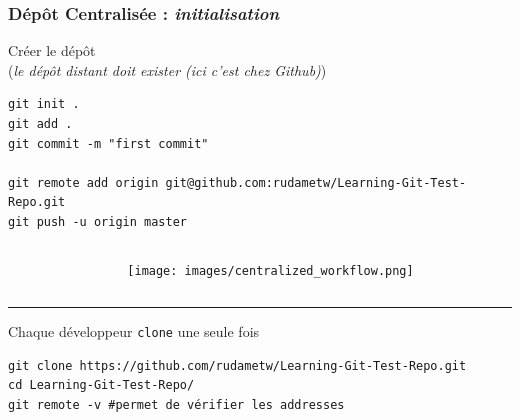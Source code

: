 \documentclass[table,tikz,12pt,svgnames]{beamer}
\begin{document}
\begin{frame}[fragile]
\frametitle{Dépôt Centralisée : \textit{initialisation}}
\begin{adjustwidth}{-2em}{0cm}{}
\color{darkgreen}%
\noindent
Créer le dépôt \\ \small(\textit{le dépôt distant doit exister (ici c'est chez Github)})
\color{black}
\end{adjustwidth}
\begin{adjustwidth}{-1em}{0cm}{}
\begin{verbatim}
git init .
git add .
git commit -m "first commit"

git remote add origin git@github.com:rudametw/Learning-Git-Test-Repo.git
git push -u origin master
\end{verbatim}
\end{adjustwidth}

\begin{adjustwidth}{-0cm}{0cm}{}
	\begin{columns}[T] %
		\begin{column}{.6\textwidth}
		\end{column}%
		\begin{column}{.3\textwidth}
			\color{black}
			\vspace{-11em}
			\begin{adjustwidth}{-0cm}{-3cm}{}
				\begin{figure}
					\hfill
					\texttt{[image: images/centralized\_workflow.png]}
				\end{figure}
			\end{adjustwidth}
		\end{column}%
	\end{columns}
	\vspace{-1em}
	\PAUSE
	\color{darkgray}\rule{\linewidth}{2pt}
	
	\begin{adjustwidth}{-0.5cm}{-0cm}{}
		\color{darkgreen}%
		Chaque développeur \texttt{clone} une seule fois
		\color{black}
		\begin{verbatim}
git clone https://github.com/rudametw/Learning-Git-Test-Repo.git
cd Learning-Git-Test-Repo/
git remote -v #permet de vérifier les addresses
		\end{verbatim}
		\end{adjustwidth}
	\end{adjustwidth}
\end{frame}
\end{document}
